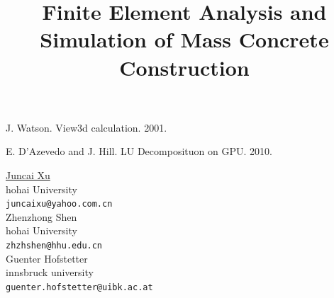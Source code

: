 \documentclass[article, A4, 11pt]{llncs}%
\begin{document}

\begin{thebibliography}{10}
{\sc J. Watson}. {View3d calculation}. 2001.

{\sc E. D'Azevedo and J. Hill}. {LU Decomposituon on GPU}. 2010.
\end{thebibliography} %

\title{Finite Element Analysis and Simulation of Mass Concrete Construction}
 \author{} \institute{}
\maketitle
\begin{center}
{\large \underline{Juncai Xu}}\\
hohai University\\
{\tt juncaixu@yahoo.com.cn}
\\ \vspace{4mm}
{\large Zhenzhong Shen}\\
hohai University\\
{\tt zhzhshen@hhu.edu.cn}
\\ \vspace{4mm}
{\large Guenter Hofstetter}\\
innsbruck university\\
{\tt guenter.hofstetter@uibk.ac.at}
\end{center}
\end{document}

